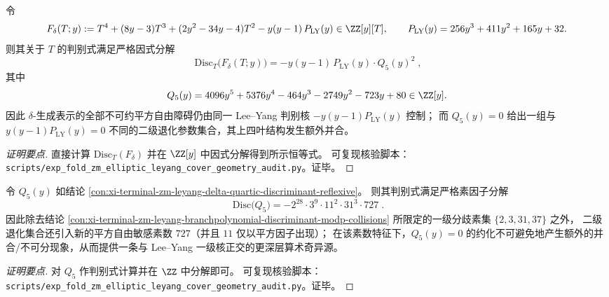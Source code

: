 \begin{conclusion}\label{con:xi-terminal-zm-leyang-delta-quartic-discriminant-reflexive}
令
\[
F_\delta(T;y):=T^{4}+(8y-3)T^{3}+(2y^{2}-34y-4)T^{2}-y(y-1)\,P_{\mathrm{LY}}(y)\in\ZZ[y][T],
\qquad
P_{\mathrm{LY}}(y)=256y^{3}+411y^{2}+165y+32.
\]
则其关于 \(T\) 的判别式满足严格因式分解
\[
\boxed{\;
\mathrm{Disc}_{T}\bigl(F_\delta(T;y)\bigr)
=-y(y-1)\,P_{\mathrm{LY}}(y)\cdot Q_{5}(y)^{2}\;},
\]
其中
\[
Q_{5}(y)=4096y^{5}+5376y^{4}-464y^{3}-2749y^{2}-723y+80\in\ZZ[y].
\]
因此 \(\delta\)-生成表示的全部不可约平方自由障碍仍由同一 Lee--Yang 判别核 \(-y(y-1)P_{\mathrm{LY}}(y)\) 控制；
而 \(Q_{5}(y)=0\) 给出一组与 \(y(y-1)P_{\mathrm{LY}}(y)=0\) 不同的二级退化参数集合，其上四叶结构发生额外并合。
\end{conclusion}
\begin{proof}[证明要点]
直接计算 \(\mathrm{Disc}_{T}(F_\delta)\) 并在 \(\ZZ[y]\) 中因式分解得到所示恒等式。
可复现核验脚本：\texttt{scripts/exp\_fold\_zm\_elliptic\_leyang\_cover\_geometry\_audit.py}。证毕。
\end{proof}




\begin{conclusion}\label{con:xi-terminal-zm-leyang-q5-discriminant-727}
令 \(Q_5(y)\) 如结论 \ref{con:xi-terminal-zm-leyang-delta-quartic-discriminant-reflexive}。
则其判别式满足严格素因子分解
\[
\boxed{\;
\mathrm{Disc}\bigl(Q_5\bigr)=-2^{28}\cdot 3^{9}\cdot 11^{2}\cdot 31^{3}\cdot 727\; }.
\]
因此除去结论 \ref{con:xi-terminal-zm-leyang-branchpolynomial-discriminant-modp-collisions} 所限定的一级分歧素集 \(\{2,3,31,37\}\) 之外，
二级退化集合还引入新的平方自由敏感素数 \(727\)（并且 \(11\) 仅以平方因子出现）；
在该素数特征下，\(Q_5(y)=0\) 的约化不可避免地产生额外的并合/不可分现象，从而提供一条与 Lee--Yang 一级核正交的更深层算术奇异源。
\end{conclusion}
\begin{proof}[证明要点]
对 \(Q_5\) 作判别式计算并在 \(\ZZ\) 中分解即可。
可复现核验脚本：\texttt{scripts/exp\_fold\_zm\_elliptic\_leyang\_cover\_geometry\_audit.py}。证毕。
\end{proof}

